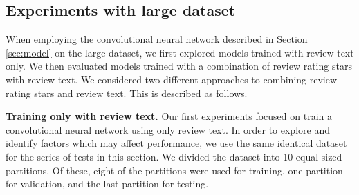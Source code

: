\documentclass[conference,compsoc]{IEEEtran}
\begin{document}
\subsection{Experiments with large dataset}
When employing the convolutional neural network described in Section \ref{sec:model} on the large dataset, we first explored models trained with review text only. We then evaluated models trained with a combination of review rating stars with review text. We considered two different approaches to combining  review rating stars and review text. This is described as follows.

\textbf{Training only with review text.} Our first experiments focused on train a convolutional neural network using only review text. In order to explore and identify factors which may affect performance, we use the same identical dataset for the series of tests in this section. We divided the dataset into 10 equal-sized partitions. Of these, eight of the partitions were used for training, one partition for validation, and the last partition for testing. 
\end{document}
